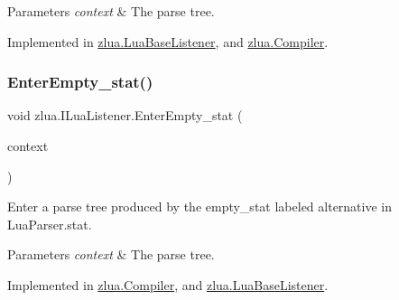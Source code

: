 \begin{DoxyParams}{Parameters}
{\em context} & The parse tree.\\
\hline
\end{DoxyParams}


Implemented in \mbox{\hyperlink{classzlua_1_1_lua_base_listener_aea9c92211c8619f5d2cf426ee5380be4}{zlua.\+Lua\+Base\+Listener}}, and \mbox{\hyperlink{classzlua_1_1_compiler_a6995466e1f6349319b4b822ec3579e50}{zlua.\+Compiler}}.

\mbox{\label{interfacezlua_1_1_i_lua_listener_aaa6652e41dd59516afb02cde17c6a347}} 
\subsubsection{\texorpdfstring{Enter\+Empty\+\_\+stat()}{EnterEmpty\_stat()}}
{\footnotesize\ttfamily void zlua.\+I\+Lua\+Listener.\+Enter\+Empty\+\_\+stat (\begin{DoxyParamCaption}\item[{\mbox{[}\+Not\+Null\mbox{]} \mbox{\hyperlink{classzlua_1_1_lua_parser_1_1_empty__stat_context}{Lua\+Parser.\+Empty\+\_\+stat\+Context}}}]{context }\end{DoxyParamCaption})}



Enter a parse tree produced by the {\ttfamily empty\+\_\+stat} labeled alternative in Lua\+Parser.\+stat. 


\begin{DoxyParams}{Parameters}
{\em context} & The parse tree.\\
\hline
\end{DoxyParams}


Implemented in \mbox{\hyperlink{classzlua_1_1_compiler_a56016ed91d28fe91587f18764fc23b1c}{zlua.\+Compiler}}, and \mbox{\hyperlink{classzlua_1_1_lua_base_listener_a5521468da5fe9ed0eb95ada9c64c801f}{zlua.\+Lua\+Base\+Listener}}.

\mbox{\label{interfacezlua_1_1_i_lua_listener_ac285772a04450f04a0552656841f1207}} 
